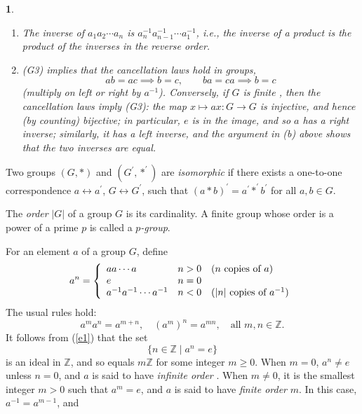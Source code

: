 \documentclass[a4paper,11pt,final]{memoir}%
\newtheorem{plain}[X]{}
\theoremstyle{nonumberplain}
\begin{document}
\begin{plain}
\begin{enumerate}
\item The inverse of $a_{1}a_{2}\cdots a_{n}$ is $a_{n}^{-1}a_{n-1}^{-1}\cdots
a_{1}^{-1}$, i.e., the inverse of a product is the product of the inverses in
the reverse order.

\item (G3) implies that the cancellation laws hold in groups,
\[
ab=ac\implies b=c,\qquad ba=ca\implies b=c
\]
(multiply on left or right by $a^{-1}$). Conversely, if $G$ is \textit{finite}%
, then the cancellation laws imply (G3): the map $x\mapsto ax\colon
G\rightarrow G$ is injective, and hence (by counting) bijective; in
particular, $e$ is in the image, and so $a$ has a right inverse; similarly, it
has a left inverse, and the argument in (b) above shows that the two inverses
are equal.
\end{enumerate}
\end{plain}

Two groups $(G,\ast)$ and $(G^{\prime},\ast^{\prime})$ are \emph{isomorphic\/}%
if there exists a one-to-one correspondence $a\leftrightarrow a^{\prime}$,
$G\leftrightarrow G^{\prime}$, such that $(a\ast b)^{\prime}=a^{\prime}%
\ast^{\prime}b^{\prime}$ for all $a,b\in G$.

The \emph{order}%
$|G|$ of a group $G$ is its cardinality. A finite group whose order is a power
of a prime $p$ is called a $p$\emph{-group}.%
%


For an element $a$ of a group $G$, define
\[
a^{n}=\left\{
\begin{array}
[c]{lll}%
aa\cdots a & n>0 & (n\text{ copies of }a)\\
e & n=0 & \\
a^{-1}a^{-1}\cdots a^{-1} & n<0 & \text{(}|n|\text{ copies of }a^{-1}\text{)}%
\end{array}
\right.
\]
The usual rules hold:
\begin{equation}
a^{m}a^{n}=a^{m+n},\quad(a^{m})^{n}=a^{mn},\quad\text{all }m,n\in\mathbb{Z}{}.
\label{e1}%
\end{equation}
It follows from (\ref{e1}) that the set
\[
\{n\in\mathbb{Z}\mid a^{n}=e\}
\]
is an ideal in $\mathbb{Z}$, and so equals $m\mathbb{Z}{}$ for some integer
$m\geq0$. When $m=0$, $a^{n}\neq e$ unless $n=0$, and $a$ is said to have
\emph{infinite order}%
%
. When $m\neq0$, it is the smallest integer $m>0$ such that $a^{m}=e$, and $a$
is said to have \emph{finite order }$m$. In this case, $a^{-1}=a^{m-1}$, and%
\end{document}
